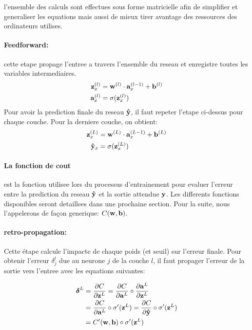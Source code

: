 \documentclass[11pt]{article}
\begin{document}
l'ensemble des calculs sont effectues sous forme matricielle afin de simplifier
et generaliser les equations mais aussi de mieux tirer avantage des ressources
des ordinateurs utilises.

\paragraph{Feedforward:} cette etape propage l'entree a travers l'ensemble du
reseau et enregistre toutes les variables intermediaires.
\begin{equation}
	\begin{aligned}
		{\bf z}_x^{(l)} &=  {\bf w}^{(l)} \cdot {\bf a}_x^{(l-1)} + {\bf b}^{(l)}\\
		{\bf a}_x^{(l)} &=  \sigma({\bf z}_x^{(l)})\\
	\end{aligned}
\end{equation}
Pour avoir la prediction finale du reseau ${\bf \hat{y}}$, il faut repeter l'etape
ci-dessus pour chaque couche. Pour la derniere couche, on obtient:
\begin{equation}
	\begin{aligned}
		{\bf z}_x^{(L)} &=  {\bf w}^{(L)} \cdot {\bf a}_x^{(L-1)} + {\bf b}^{(L)}\\
		{\bf \hat{y}}_x &=  \sigma({\bf z}_x^{(L)})\\
	\end{aligned}
\end{equation}

\paragraph{La fonction de cout}est la fonction utilisee lors du processus
d'entrainement pour evaluer l'erreur entre la prediction du reseau
${\bf \hat{y}}$ et la sortie attendue ${\bf y}$. Les differents fonctions
disponibles seront detaillees dans une prochaine section.
Pour la suite, nous l'appelerons de fa\c con generique: $C({\bf w}, {\bf b})$.

\paragraph{retro-propagation:} Cette \'etape calcule l'impacte de chaque poids
(et seuil) sur l'erreur finale. Pour obtenir l'erreur $\delta_j^l$ due au neurone
$j$ de la couche $l$, il faut propager l'erreur de la sortie vers l'entree
avec les equations suivantes:

\begin{equation}
	\begin{aligned}
		{\boldsymbol \delta}^L &= \frac{\partial C}{\partial {\bf z}^L} =
		\frac{\partial C}{\partial {\bf a}^L} \circ \frac{\partial {\bf a}^L}{\partial {\bf z}^L} \\
		&= \frac{\partial C}{\partial {\bf a}^L} \circ \sigma'({\bf z}^L)
		= \frac{\partial C}{\partial {\bf \hat y}} \circ \sigma'({\bf z}^L)\\
		&= C'({\bf w}, {\bf b}) \circ \sigma'({\bf z}^L)\\
	\end{aligned}
\end{equation}
\end{document}
